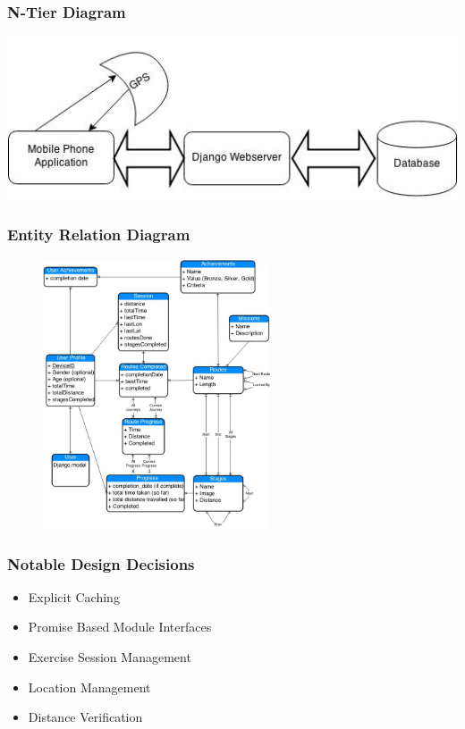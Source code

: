 \documentclass{beamer}
\begin{document}
\begin{frame}
  \frametitle{N-Tier Diagram}
  \includegraphics[width=\textwidth]{images/n-tier.jpg}
\end{frame}

\begin{frame}
  \frametitle{Entity Relation Diagram}
  \begin{figure}[h]
    \centering
    \includegraphics[width=0.6\textwidth]{images/ER_prod.jpg}
  \end{figure}
\end{frame}

\begin{frame}
  \frametitle{Notable Design Decisions}
  \begin{itemize}
    \item Explicit Caching
    \item Promise Based Module Interfaces
    \item Exercise Session Management
    \item Location Management
    \item Distance Verification
  \end{itemize}
\end{frame}
\end{document}
